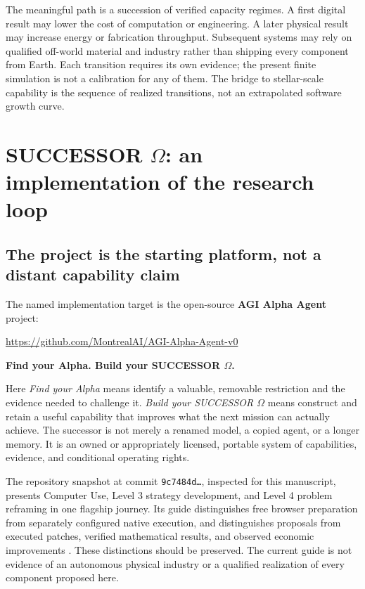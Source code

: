 \documentclass[11pt,letterpaper]{article}
\newcommand{\1}{\mathbf 1}
\theoremstyle{remark}\newtheorem{remark}{Remark}[section]
\begin{document}
The meaningful path is a succession of verified capacity regimes. A first digital result may lower the cost of computation or engineering. A later physical result may increase energy or fabrication throughput. Subsequent systems may rely on qualified off-world material and industry rather than shipping every component from Earth. Each transition requires its own evidence; the present finite simulation is not a calibration for any of them. The bridge to stellar-scale capability is the sequence of realized transitions, not an extrapolated software growth curve.

\section{SUCCESSOR \texorpdfstring{$\Omega$}{Omega}: an implementation of the research loop}\label{sec:successor}
\subsection{The project is the starting platform, not a distant capability claim}
The named implementation target is the open-source \textbf{AGI Alpha Agent} project:
\begin{center}
\url{https://github.com/MontrealAI/AGI-Alpha-Agent-v0}\par\smallskip
\textbf{Find your Alpha. Build your SUCCESSOR $\Omega$.}
\end{center}
Here \emph{Find your Alpha} means identify a valuable, removable restriction and the evidence needed to challenge it. \emph{Build your SUCCESSOR $\Omega$} means construct and retain a useful capability that improves what the next mission can actually achieve. The successor is not merely a renamed model, a copied agent, or a longer memory. It is an owned or appropriately licensed, portable system of capabilities, evidence, and conditional operating rights.

The repository snapshot at commit \texttt{9c7484d\ldots}, inspected for this manuscript, presents Computer Use, Level 3 strategy development, and Level 4 problem reframing in one flagship journey. Its guide distinguishes free browser preparation from separately configured native execution, and distinguishes proposals from executed patches, verified mathematical results, and observed economic improvements \citep{alphareadme,alphaguide}. These distinctions should be preserved. The current guide is not evidence of an autonomous physical industry or a qualified realization of every component proposed here.
\end{document}
